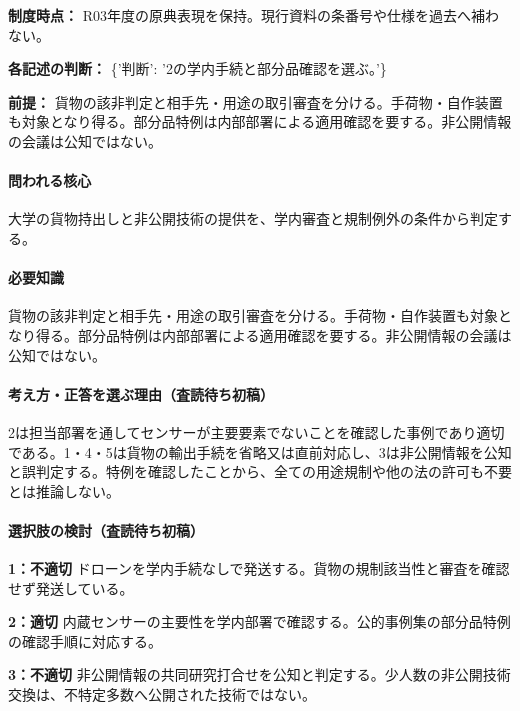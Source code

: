 \noindent\textbf{制度時点：} R03年度の原典表現を保持。現行資料の条番号や仕様を過去へ補わない。\par

\noindent\textbf{各記述の判断：} \{'判断': '2の学内手続と部分品確認を選ぶ。'\}\par

\noindent\textbf{前提：} 貨物の該非判定と相手先・用途の取引審査を分ける。手荷物・自作装置も対象となり得る。部分品特例は内部部署による適用確認を要する。非公開情報の会議は公知ではない。\par

\paragraph{問われる核心} 大学の貨物持出しと非公開技術の提供を、学内審査と規制例外の条件から判定する。

\paragraph{必要知識} 貨物の該非判定と相手先・用途の取引審査を分ける。手荷物・自作装置も対象となり得る。部分品特例は内部部署による適用確認を要する。非公開情報の会議は公知ではない。

\paragraph{考え方・正答を選ぶ理由（査読待ち初稿）} 2は担当部署を通してセンサーが主要要素でないことを確認した事例であり適切である。1・4・5は貨物の輸出手続を省略又は直前対応し、3は非公開情報を公知と誤判定する。特例を確認したことから、全ての用途規制や他の法の許可も不要とは推論しない。

\paragraph{選択肢の検討（査読待ち初稿）}\mbox{}\par

\noindent\textbf{1：不適切} ドローンを学内手続なしで発送する。貨物の規制該当性と審査を確認せず発送している。\par

\noindent\textbf{2：適切} 内蔵センサーの主要性を学内部署で確認する。公的事例集の部分品特例の確認手順に対応する。\par

\noindent\textbf{3：不適切} 非公開情報の共同研究打合せを公知と判定する。少人数の非公開技術交換は、不特定多数へ公開された技術ではない。\par

